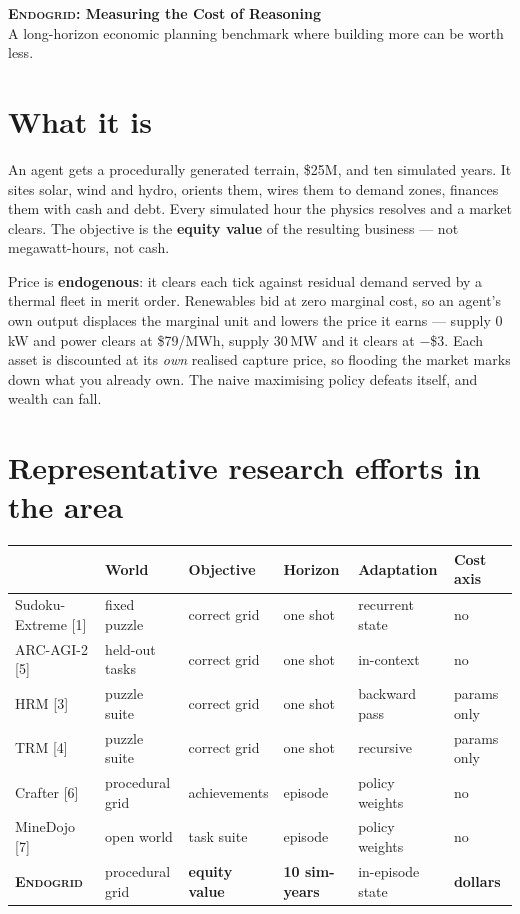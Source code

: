\documentclass[9pt]{extarticle}
\begin{document}
{\Large\bfseries \textsc{Endogrid}: Measuring the Cost of Reasoning}\\[0.3ex]
{\small A long-horizon economic planning benchmark where building more can be
worth less.}

\section{What it is}

An agent gets a procedurally generated terrain, \$25M, and ten simulated years.
It sites solar, wind and hydro, orients them, wires them to demand zones,
finances them with cash and debt. Every simulated hour the physics resolves and
a market clears. The objective is the \textbf{equity value} of the resulting
business --- not megawatt-hours, not cash.

Price is \textbf{endogenous}: it clears each tick against residual demand served
by a thermal fleet in merit order. Renewables bid at zero marginal cost, so an
agent's own output displaces the marginal unit and lowers the price it earns ---
supply 0\,kW and power clears at \$79/MWh, supply 30\,MW and it clears at
$-$\$3. Each asset is discounted at its \emph{own} realised capture price, so
flooding the market marks down what you already own. The naive maximising policy
defeats itself, and wealth can fall.

\section{Representative research efforts in the area}

\begin{center}\small
\setlength{\tabcolsep}{4pt}
\begin{tabular}{llllll}
\toprule
& World & Objective & Horizon & Adaptation & Cost axis \\
\midrule
Sudoku-Extreme [1] & fixed puzzle & correct grid & one shot & recurrent state & no \\
ARC-AGI-2 [5] & held-out tasks & correct grid & one shot & in-context & no \\
HRM [3] & puzzle suite & correct grid & one shot & backward pass & params only \\
TRM [4] & puzzle suite & correct grid & one shot & recursive & params only \\
Crafter [6] & procedural grid & achievements & episode & policy weights & no \\
MineDojo [7] & open world & task suite & episode & policy weights & no \\
\midrule
\textbf{\textsc{Endogrid}} & procedural grid & \textbf{equity value} & \textbf{10 sim-years} & in-episode state & \textbf{dollars} \\
\bottomrule
\end{tabular}
\end{center}
\end{document}
